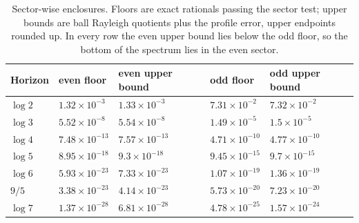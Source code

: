 \begin{table}[ht]
\centering
\caption{Sector-wise enclosures. Floors are exact rationals passing the sector test; upper bounds are ball Rayleigh quotients plus the profile error, upper endpoints rounded up. In every row the even upper bound lies below the odd floor, so the bottom of the spectrum lies in the even sector.}
\label{tab:sectors}
\begin{tabular}{@{}lllll@{}}
\toprule
Horizon & even floor & even upper bound & odd floor & odd upper bound\\
\midrule
$\log2$ & $1.32\times10^{-3}$ & $1.33\times10^{-3}$ & $7.31\times10^{-2}$ & $7.32\times10^{-2}$\\
$\log3$ & $5.52\times10^{-8}$ & $5.54\times10^{-8}$ & $1.49\times10^{-5}$ & $1.5\times10^{-5}$\\
$\log4$ & $7.48\times10^{-13}$ & $7.57\times10^{-13}$ & $4.71\times10^{-10}$ & $4.77\times10^{-10}$\\
$\log5$ & $8.95\times10^{-18}$ & $9.3\times10^{-18}$ & $9.45\times10^{-15}$ & $9.7\times10^{-15}$\\
$\log6$ & $5.93\times10^{-23}$ & $7.33\times10^{-23}$ & $1.07\times10^{-19}$ & $1.36\times10^{-19}$\\
$9/5$ & $3.38\times10^{-23}$ & $4.14\times10^{-23}$ & $5.73\times10^{-20}$ & $7.23\times10^{-20}$\\
$\log7$ & $1.37\times10^{-28}$ & $6.81\times10^{-28}$ & $4.78\times10^{-25}$ & $1.57\times10^{-24}$\\
\bottomrule
\end{tabular}
\end{table}
